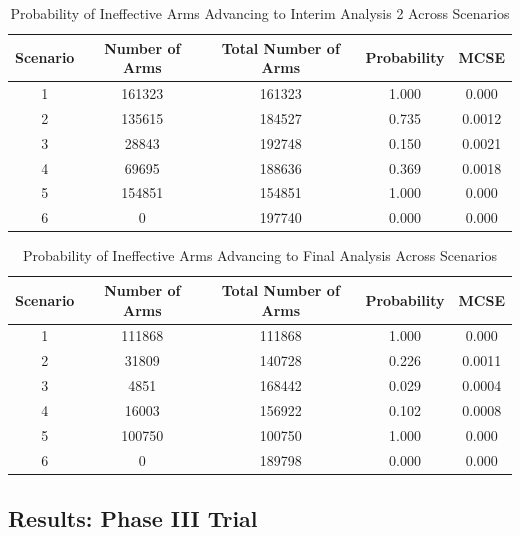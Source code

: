 \documentclass[11pt, a4paper]{article}\usepackage[]{graphicx}\usepackage[]{xcolor}
\begin{document}
\begin{table}[ht]
    \centering
    \caption{Probability of Ineffective Arms Advancing to Interim Analysis 2 Across Scenarios}
    \label{tab:ineffective_arm_probability_interim2}
    \begin{tabular}{ccccc}
        \toprule
        \textbf{Scenario} & \textbf{Number of Arms} & \textbf{Total Number of Arms} & \textbf{Probability} & \textbf{MCSE} \\
        \midrule
        1 & 161323 & 161323 & 1.000 & 0.000 \\
        2 & 135615 & 184527 & 0.735 & 0.0012 \\
        3 & 28843  & 192748 & 0.150 & 0.0021 \\
        4 & 69695  & 188636 & 0.369 & 0.0018 \\
        5 & 154851 & 154851 & 1.000 & 0.000 \\
        6 & 0      & 197740 & 0.000 & 0.000 \\
        \bottomrule
    \end{tabular}
\end{table}



\begin{table}[ht]
    \centering
    \caption{Probability of Ineffective Arms Advancing to Final Analysis Across Scenarios}
    \label{tab:ineffective_arm_probability_final}
    \begin{tabular}{ccccc}
        \toprule
        \textbf{Scenario} & \textbf{Number of Arms} & \textbf{Total Number of Arms} & \textbf{Probability} & \textbf{MCSE} \\
        \midrule
        1 & 111868 & 111868 & 1.000 & 0.000 \\
        2 & 31809  & 140728 & 0.226 & 0.0011 \\
        3 & 4851   & 168442 & 0.029 & 0.0004 \\
        4 & 16003  & 156922 & 0.102 & 0.0008 \\
        5 & 100750 & 100750 & 1.000 & 0.000 \\
        6 & 0      & 189798 & 0.000 & 0.000 \\
        \bottomrule
    \end{tabular}
\end{table}



\subsection{Results: Phase III Trial} \label{sec:simulation_results_phase3}
\end{document}
